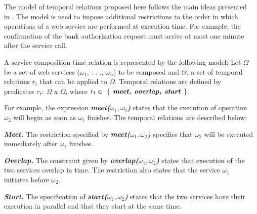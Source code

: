 The model of temporal relations proposed here follows the main ideas presented in
\cite{Allen83, BeVaC00}. The model is used to impose additional restrictions to
the order in which operations of a web service are performed at execution time. For example, the
confirmation of the bank authorization request must arrive at most one minute after the service call.
 
A service composition time relation is represented by the following
model: Let   $\Omega$ be a set of web services ($\omega_1$, . . .,
$\omega_n$) to be composed and $\Theta$, a set of temporal relations $r_t$ that can be applied to $\Omega$. 
Temporal relations are defined by predicates $r_t:\ \Omega$ x $\Omega$, where
$r_t \in~\{\textbf{\textit{ %
meet, overlap, start
}}\}. $

For example, the  
expression \textbf{\textit{meet($\omega_1, \omega_2$)}}
states that the execution of operation $\omega_2$ will begin as soon as $\omega_1$ finishes.
The temporal relations are described below:



\begin{trivlist}

\item{\bf\em Meet.}
The restriction specified by \textbf{\textit{meet($\omega_1, \omega_2$)}} specifies that $\omega_2$ will be executed immediately after $\omega_1$ finishes.

\item{\bf\em Overlap.}
The constraint given by \textbf{\textit{overlap($\omega_1, \omega_2$)}}
states that execution of the two services overlap in time. 
The restriction also states that the service $\omega_1$ initiates before $\omega_2$.

\item{\bf\em Start.}
The specification of \textbf{\textit{start($\omega_1, \omega_2$)}}
states that the two services have their execution in parallel and that they start at the same time. 

\end{trivlist}
 

